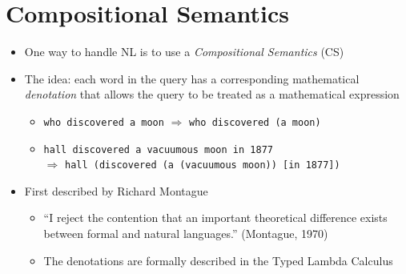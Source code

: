 \documentclass[logoontitle,tabu,supertabular,aspectratio=43]{preney-uwindsor-beamer}
\begin{document}

	\section{Compositional Semantics}
	\begin{frame}{\insertsection}
		\begin{itemize}
			\item One way to handle NL is to use a {\em Compositional Semantics} (CS)
			\item The idea: each word in the query has a corresponding mathematical {\em denotation} that allows the query to be treated as a mathematical expression
			\begin{itemize}
				\item \texttt{who discovered a moon} $\Rightarrow$ \texttt{who discovered (a moon)}
				\item \texttt{hall discovered a vacuumous moon in 1877} \\ $\Rightarrow$ \texttt{hall (discovered (a (vacuumous moon)) [in 1877])}
			\end{itemize}
			\item First described by Richard Montague \cite{Dowty:wall}
			\begin{itemize}
				\item ``I reject the contention that an important theoretical difference exists between formal and natural languages.'' (Montague, 1970)
				\item The denotations are formally described in the Typed Lambda Calculus
			\end{itemize}
		\end{itemize}
	\end{frame}
\end{document}
